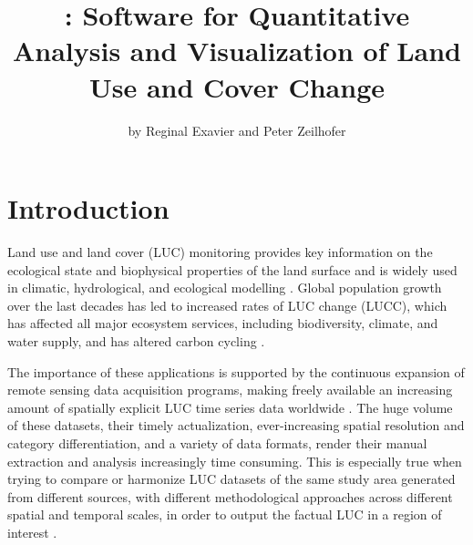 \title{: Software for Quantitative Analysis and Visualization of Land
Use and Cover Change}
\author{by Reginal Exavier and Peter Zeilhofer}

\maketitle


\hypertarget{introduction}{%
\section{Introduction}\label{introduction}}

Land use and land cover (LUC) monitoring provides key information on the
ecological state and biophysical properties of the land surface and is
widely used in climatic, hydrological, and ecological modelling
\citep{Brovkin2013, Verburg2015}. Global population growth over the last
decades has led to increased rates of LUC change (LUCC), which has
affected all major ecosystem services, including biodiversity, climate,
and water supply, and has altered carbon cycling
\citep{Ballantyne2015, Nelson2010, Song2018}.

The importance of these applications is supported by the continuous
expansion of remote sensing data acquisition programs, making freely
available an increasing amount of spatially explicit LUC time series
data worldwide \citep{Prestele2016}. The huge volume of these datasets,
their timely actualization, ever-increasing spatial resolution and
category differentiation, and a variety of data formats, render their
manual extraction and analysis increasingly time consuming. This is
especially true when trying to compare or harmonize LUC datasets of the
same study area generated from different sources, with different
methodological approaches across different spatial and temporal scales,
in order to output the factual LUC in a region of interest
\citep{Yang2017}.

